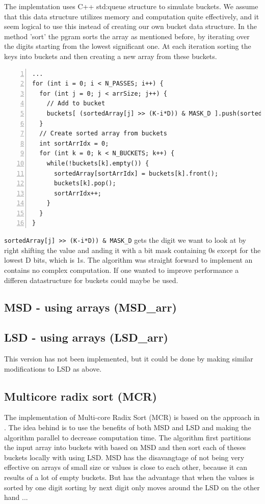 The implemtation uses C++ std:queue structure to simulate buckets. We assume that this data structure utilizes memory and computation quite effectively, and it seem logical to use this instead of creating our own bucket data structure.
In the method 'sort' the pgram sorts the array as mentioned before, by iterating over the digits starting from the lowest significant one. At each iteration sorting the keys into buckets and then creating a new array from these buckets.
\begin{lstlisting}[numbers=left]
...
for (int i = 0; i < N_PASSES; i++) {
  for (int j = 0; j < arrSize; j++) {
    // Add to bucket
    buckets[ (sortedArray[j] >> (K-i*D)) & MASK_D ].push(sortedArray[j]);
  }
  // Create sorted array from buckets
  int sortArrIdx = 0;
  for (int k = 0; k < N_BUCKETS; k++) {
    while(!buckets[k].empty()) {
      sortedArray[sortArrIdx] = buckets[k].front();
      buckets[k].pop();
      sortArrIdx++;
    }
  }
}
\end{lstlisting}
\verb!sortedArray[j] >> (K-i*D)) & MASK_D! gets the digit we want to look at by right shifting the value and anding it with a bit mask containing 0s except for the lowest D bits, which is 1s.
The algorithm was straight forward to implement an contains no complex computation. If one wanted to improve performance a differen datastructure for buckets could maybe be used.


\subsection{MSD - using arrays (MSD\_arr)}


\subsection{LSD - using arrays (LSD\_arr)}
This version has not been implemented, but it could be done by making similar modifications to LSD as above.


\subsection{Multicore radix sort (MCR)}
The implementation of Multi-core Radix Sort (MCR) is based on the approach in \citep{radixSort}. The idea behind is to use the benefits of both MSD and LSD and making the algorithm parallel to decrease computation time. 
The algorithm first partitions the input array into buckets with based on MSD and then sort each of theses buckets locally with using LSD.  
MSD has the disavangtage of not being very effective on arrays of small size or values is close to each other, because it can results of a lot of empty buckets. 
But has the advantage that when the values is sorted by one digit sorting by next digit only moves around the 
LSD on the other hand ...

